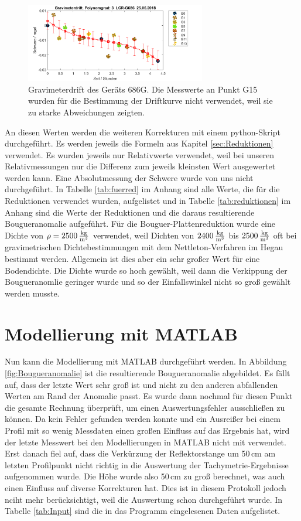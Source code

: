 \begin{figure}[!ht]
 \centering
 \includegraphics[width=0.7\textwidth]{fig/G686drift_endgultig}
 \caption[Gravimeterdrift des Geräts 686G]{Gravimeterdrift des Geräts 686G. Die Messwerte an Punkt G15 wurden für die Bestimmung der Driftkurve nicht verwendet, weil sie zu starke Abweichungen zeigten.}
 \label{fig:drift2}
\end{figure}

An diesen Werten werden die weiteren Korrekturen mit einem python-Skript durchgeführt. Es werden jeweils die Formeln aus Kapitel \ref{sec:Reduktionen} verwendet. Es wurden jeweils nur Relativwerte verwendet, weil bei unseren Relativmessungen nur die Differenz zum jeweils kleinsten Wert ausgewertet werden kann. Eine Absolutmessung der Schwere wurde von uns nicht durchgeführt. In Tabelle \ref{tab:fuerred} im Anhang sind alle Werte, die für die Reduktionen verwendet wurden, aufgelistet und in Tabelle \ref{tab:reduktionen} im Anhang sind die Werte der Reduktionen und die daraus resultierende Bougueranomalie aufgeführt. Für die Bouguer-Plattenreduktion wurde eine Dichte von $\rho=2500\,\frac{\mathrm{kg}}{\mathrm{m^3}}$ verwendet, weil Dichten von $2400\,\frac{\mathrm{kg}}{\mathrm{m^3}}$ bis $2500\,\frac{\mathrm{kg}}{\mathrm{m^3}}$ oft bei gravimetrischen Dichtebestimmungen mit dem Nettleton-Verfahren im Hegau bestimmt werden. Allgemein ist dies aber ein sehr großer Wert für eine Bodendichte. Die Dichte wurde so hoch gewählt, weil dann die Verkippung der Bougueranomlie geringer wurde und so der Einfallswinkel nicht so groß gewählt werden musste.

\section{Modellierung mit MATLAB}
\label{sec:ModMAT}

Nun kann die Modellierung mit MATLAB durchgeführt werden. In Abbildung \ref{fig:Bougueranomalie} ist die resultierende Bougueranomalie abgebildet. Es fällt auf, dass der letzte Wert sehr groß ist und nicht zu den anderen abfallenden Werten am Rand der Anomalie passt. Es wurde dann nochmal für diesen Punkt die gesamte Rechnung überprüft, um einen Auswertungsfehler ausschließen zu können. Da kein Fehler gefunden werden konnte und ein Ausreißer bei einem Profil mit so wenig Messdaten einen großen Einfluss auf das Ergebnis hat, wird der letzte Messwert bei den Modellierungen in MATLAB nicht mit verwendet. Erst danach fiel auf, dass die Verkürzung der Reflektorstange um 50\,cm am letzten Profilpunkt nicht richtig in die Auswertung der Tachymetrie-Ergebnisse aufgenommen wurde. Die Höhe wurde also 50\,cm zu groß berechnet, was auch einen Einfluss auf diverse Korrekturen hat. Dies ist in diesem Protokoll jedoch nciht mehr berücksichtigt, weil die Auswertung schon durchgeführt wurde.
In Tabelle \ref{tab:Input} sind die in das Programm eingelesenen Daten aufgelistet.

